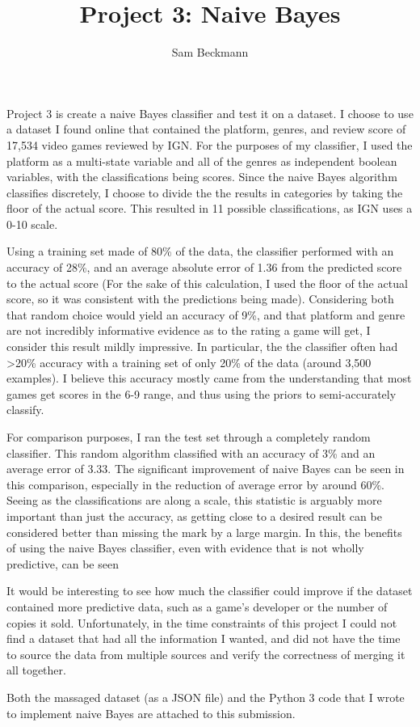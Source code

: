 \documentclass{article}
\author{Sam Beckmann}
\title{Project 3: Naive Bayes}
\begin{document}
\maketitle
Project 3 is create a naive Bayes classifier and test it on a dataset. I choose to use a dataset I found online that contained the platform, genres, and review score of 17,534 video games reviewed by IGN. For the purposes of my classifier, I used the platform as a multi-state variable and all of the genres as independent boolean variables, with the classifications being scores. Since the naive Bayes algorithm classifies discretely, I choose to divide the the results in categories by taking the floor of the actual score. This resulted in 11 possible classifications, as IGN uses a 0-10 scale.

Using a training set made of 80\% of the data, the classifier performed with an accuracy of 28\%, and an average absolute error of 1.36 from the predicted score to the actual score (For the sake of this calculation, I used the floor of the actual score, so it was consistent with the predictions being made). Considering both that random choice would yield an accuracy of 9\%, and that platform and genre are not incredibly informative evidence as to the rating a game will get, I consider this result mildly impressive. In particular, the the classifier often had \textgreater  20\% accuracy with a training set of only 20\% of the data (around 3,500 examples). I believe this accuracy mostly came from the understanding that most games get scores in the 6-9 range, and thus using the priors to semi-accurately classify.

For comparison purposes, I ran the test set through a completely random classifier. This random algorithm classified with an accuracy of 3\% and an average error of 3.33. The significant improvement of naive Bayes can be seen in this comparison, especially in the reduction of average error by around 60\%. Seeing as the classifications are along a scale, this statistic is arguably more important than just the accuracy, as getting close to a desired result can be considered better than missing the mark by a large margin. In this, the benefits of using the naive Bayes classifier, even with evidence that is not wholly predictive, can be seen

It would be interesting to see how much the classifier could improve if the dataset contained more predictive data, such as a game's developer or the number of copies it sold. Unfortunately, in the time constraints of this project I could not find a dataset that had all the information I wanted, and did not have the time to source the data from multiple sources and verify the correctness of merging it all together.

Both the massaged dataset (as a JSON file) and the Python 3 code that I wrote to implement naive Bayes are attached to this submission.
\end{document}
